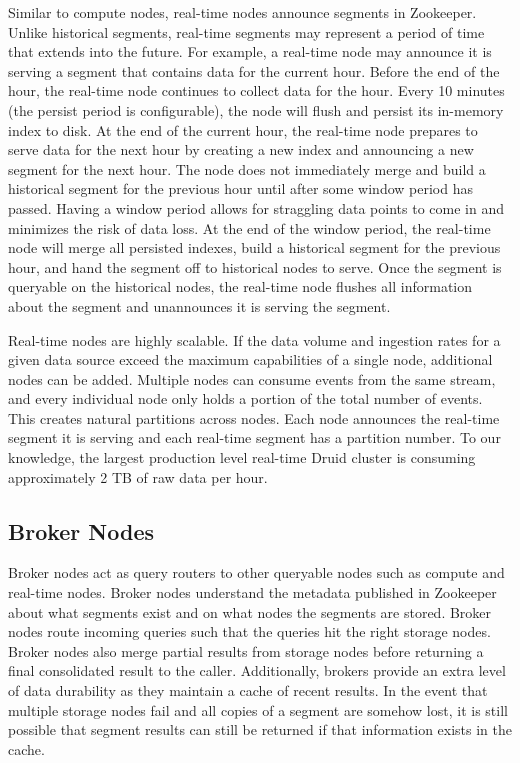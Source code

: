 \documentclass{vldb}
\begin{document}
Similar to compute nodes, real-time nodes announce segments in
Zookeeper. Unlike historical segments, real-time segments may
represent a period of time that extends into the future. For example,
a real-time node may announce it is serving a segment that contains
data for the current hour. Before the end of the hour, the real-time
node continues to collect data for the hour. Every 10 minutes (the
persist period is configurable), the node will flush and persist its
in-memory index to disk. At the end of the current hour, the real-time
node prepares to serve data for the next hour by creating a new index
and announcing a new segment for the next hour. The node does not
immediately merge and build a historical segment for the previous hour
until after some window period has passed. Having a window period
allows for straggling data points to come in and minimizes the risk of
data loss. At the end of the window period, the real-time node will
merge all persisted indexes, build a historical segment for the
previous hour, and hand the segment off to historical nodes to
serve. Once the segment is queryable on the historical nodes, the
real-time node flushes all information about the segment and
unannounces it is serving the segment.

Real-time nodes are highly scalable. If the data volume and ingestion rates
for a given data source exceed the maximum capabilities of a single node, additional nodes can be added.
Multiple nodes can consume events from the same stream, and every individual node only holds a portion of the total number of events.
This creates natural partitions across nodes. Each node announces the real-time segment it is serving and each real-time segment has a partition number.
To our knowledge, the largest production level real-time Druid cluster is consuming approximately
2 TB of raw data per hour.

\subsection{Broker Nodes}
Broker nodes act as query routers to other queryable nodes such as
compute and real-time nodes. Broker nodes understand the metadata
published in Zookeeper about what segments exist and on what nodes the
segments are stored. Broker nodes route incoming queries such that the queries hit
the right storage nodes. Broker nodes also merge partial results from
storage nodes before returning a final consolidated result to the
caller.  Additionally, brokers provide an extra level of data
durability as they maintain a cache of recent results. In the event
that multiple storage nodes fail and all copies of a segment are
somehow lost, it is still possible that segment results can still be
returned if that information exists in the cache.
\end{document}
